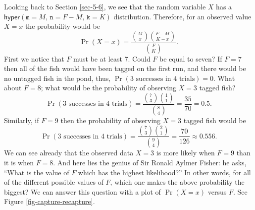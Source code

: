\documentclass[captions=tableheading]{scrbook}
\begin{document}
\begin{example}
Looking back to Section \ref{sec-5-6}, we see that the random variable \(X\) has a \(\mathsf{hyper}(\mathtt{m}=M,\,\mathtt{n}=F-M,\,\mathtt{k}=K)\) distribution. Therefore, for an observed value \(X=x\) the probability would be
\[
\Pr(X=x)=\frac{{M \choose x}{F-M \choose K-x}}{{F \choose K}}.
\]
First we notice that \(F\) must be at least 7. Could \(F\) be equal to seven? If \(F=7\) then all of the fish would have been tagged on the first run, and there would be no untagged fish in the pond, thus, \(\Pr(\mbox{3 successes in 4 trials})=0\). 
What about \(F=8\); what would be the probability of observing \(X=3\) tagged fish?
\[
\Pr(\mbox{3 successes in 4 trials})=\frac{{7 \choose 3}{1 \choose 1}}{{8 \choose 4}}=\frac{35}{70}=0.5.
\]
Similarly, if \(F=9\) then the probability of observing \(X=3\) tagged fish would be
\[
\Pr(\mbox{3 successes in 4 trials})=\frac{{7 \choose 3}{2 \choose 1}}{{9 \choose 4}}=\frac{70}{126}\approx0.556.
\]
We can see already that the observed data \(X=3\) is more likely when \(F=9\) than it is when \(F=8\). And here lies the genius of Sir Ronald Aylmer Fisher: he asks, ``What is the value of \(F\) which has the highest likelihood?'' In other words, for all of the different possible values of \(F\), which one makes the above probability the biggest? We can answer this question with a plot of \(\Pr(X=x)\) versus \(F\). See Figure \ref{fig-capture-recapture}.
\end{example}
\end{document}
